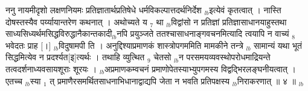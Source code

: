 \documentclass[article,12pt,a4paper]{memoir}%
\newcounter{parCount}
\begin{document}
	  
	  \pstart \leavevmode%
	ननु नायमीदृशो लक्षणनियमः प्रतिज्ञातार्थप्रतिषेधे धर्मविकल्पात्तदर्थनिर्देश {\tiny $_{lb}$}इत्येवं कृतत्वात् । नास्ति दोषस्तस्यैव पर्य्यायान्तरेण कथनात् । अथोच्यते य {\tiny $_{7}$} था {\tiny $_{lb}$}विद्वांसो न प्रतिज्ञां प्रतिज्ञासाधानयाहुस्तथा साध्यसिध्यर्थमसिद्धविरुद्धानैकान्तकादी{\tiny $_{lb}$}नपि प्रयुञ्जते ततश्चासाधनाङ्गवचनमित्यादि त्वयापि न वाच्यं {\tiny $_{8}$} भवेदतः प्राह [।] {\tiny $_{lb}$}विदुषामपी \cite[9b6]{vn-msN} ति । अनुद्दिश्याप्रमाणकं शास्त्रोपगममिति मामकीने तन्त्रे {\tiny $_{lb}$} \leavevmode{} सामान्यं यथा भूतं सिद्धमित्येव न प्रदर्श्यत[इ]त्यर्थः । तथाहि व्युत्थित {\tiny $_{9}$} \leavevmode{} चेतसो {\tiny $_{lb}$}न परसमयव्यवस्थोपरोधमाद्रियन्ते तत्वदर्शनाध्यवसायशूराः शूरयः । {\tiny $_{lb}$}अप्रमाणकम्वचनं प्रमाणोपेतस्याभ्युपगमस्य विद्वद्भिरलङ्घनीयत्वात् । एतच्च {\tiny $_{lb}$}स्या {\tiny $_{1}$} त् प्रमाणैरसमर्थितसाधनाभिधानाद्वाद्यपि जेता न भवति प्रतिपक्षस्य {\tiny $_{lb}$}निराकरणात् ॥ ४ ॥
	{}
	\pend%
      {\tiny $_{lb}$}
\end{document}
